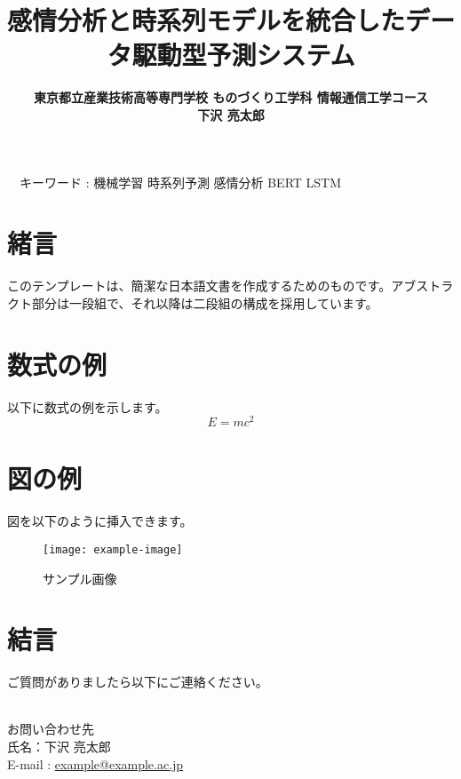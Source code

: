 \documentclass[a4paper,11pt]{article}
\title{{\TitleJFont\bfseries 感情分析と時系列モデルを統合したデータ駆動型予測システム \\ }}
\author{\large\TitleJFont\bfseries 東京都立産業技術高等専門学校 ものづくり工学科 情報通信工学コース \\ \large\TitleJFont\bfseries 下沢 亮太郎}
\date{}
\newenvironment{customabstract}
{\noindent\hfuzz=10pt\hbadness=10000\begin{flushleft}\fontsize{16pt}{16pt}\small}
{\end{flushleft}}
\begin{document}
\maketitle
\thispagestyle{empty}

\begin{customabstract}
　キーワード : 機械学習 時系列予測 感情分析 BERT LSTM
\end{customabstract}

\setlength{\columnsep}{40pt}

\begin{multicols}{2}

\section{緒言}
このテンプレートは、簡潔な日本語文書を作成するためのものです。アブストラクト部分は一段組で、それ以降は二段組の構成を採用しています。

\section{数式の例}
以下に数式の例を示します。
\begin{equation}
E = mc^2
\end{equation}

\section{図の例}
図を以下のように挿入できます。
\begin{figure}[h]
    \centering
    \texttt{[image: example-image]} %
    \caption{サンプル画像}
\end{figure}

\section{結言}
ご質問がありましたら以下にご連絡ください。

\noindent\hrulefill\\
お問い合わせ先\\
氏名：下沢 亮太郎 \\
E-mail : \href{mailto:example@example.ac.jp}{example@example.ac.jp}

\end{multicols}
\end{document}
